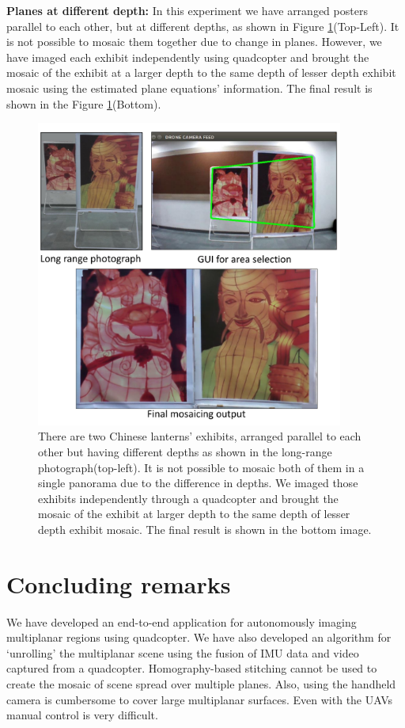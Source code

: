 \textbf{Planes at different depth:} In this experiment we have arranged posters
parallel to each other, but at different depths, as shown in Figure
\ref{fig:resultFrontBack}(Top-Left). It is not possible to mosaic them together
due to change in planes. However, we have imaged each exhibit independently
using quadcopter and brought the mosaic of the exhibit at a larger depth to the same depth
of lesser depth exhibit mosaic using the estimated plane equations' information.
The final result is shown in the Figure \ref{fig:resultFrontBack}(Bottom).
\begin{figure}
\centering
\includegraphics[width=0.9\textwidth]{figures/multiplanar/frontback.pdf}
\caption[Result: Imaging at different depths]{There are two Chinese lanterns'
exhibits, arranged parallel to each other but having different depths as shown in the long-range
photograph(top-left). It is not possible to mosaic both of them in a single
panorama due to the difference in depths. We imaged those exhibits
independently through a quadcopter and brought the mosaic of the exhibit at larger
depth to the same depth of lesser depth exhibit mosaic. The final result is
shown in the bottom image.}
\label{fig:resultFrontBack}
\end{figure}

\section{Concluding remarks}
We have developed an end-to-end application for autonomously imaging multiplanar
regions using quadcopter. We have also developed an algorithm for `unrolling'
the multiplanar scene using the fusion of IMU data and video captured from
a quadcopter. Homography-based stitching cannot be used to create the mosaic of
scene spread over multiple planes. Also, using the handheld camera is cumbersome
to cover large multiplanar surfaces. Even with the UAVs manual control is very difficult.

